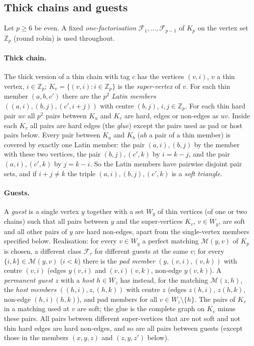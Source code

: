 \subsection{Thick chains and guests}\label{sec:hthick}
Let $p\ge6$ be even. A fixed \emph{one-factorisation} $\mathcal F_1,\dots,\mathcal F_{p-1}$ of $K_p$ on the vertex set $\mathbb Z_p$ (round robin) is used throughout.

\paragraph{Thick chain.} The thick version of a thin chain with tag $c$ has the vertices $(v,i)$, $v$ a thin vertex, $i\in\mathbb Z_p$; $K_v=\{(v,i):i\in\mathbb Z_p\}$ is the \emph{super-vertex} of $v$. For each thin member $(a,b,c')$ there are the $p^2$ \emph{Latin members} $((a,i),(b,j),(c',i+j))$ with centre $(b,j)$, $i,j\in\mathbb Z_p$. For each thin hard pair $uv$ all $p^2$ pairs between $K_u$ and $K_v$ are hard, edges or non-edges as $uv$. Inside each $K_v$ all pairs are hard edges (the \emph{glue}) except the pairs used as pad or host pairs below. Every pair between $K_a$ and $K_b$ ($ab$ a pair of a thin member) is covered by exactly one Latin member: the pair $(a,i),(b,j)$ by the member with these two vertices, the pair $(b,j),(c',k)$ by $i=k-j$, and the pair $(a,i),(c',k)$ by $j=k-i$. So the Latin members have pairwise disjoint pair sets, and if $i+j\ne k$ the triple $(a,i),(b,j),(c',k)$ is a \emph{soft triangle}.

\paragraph{Guests.} A \emph{guest} is a single vertex $y$ together with a set $W_y$ of thin vertices (of one or two chains) such that all pairs between $y$ and the super-vertices $K_v$, $v\in W_y$, are soft and all other pairs of $y$ are hard non-edges, apart from the single-vertex members specified below. Realisation: for every $v\in W_y$ a perfect matching $\mathcal M(y,v)$ of $K_p$ is chosen, a different class $\mathcal F_r$ for different guests at the same $v$; for every $\{i,k\}\in\mathcal M(y,v)$ ($i<k$) there is the \emph{pad member} $(y,(v,i),(v,k))$ with centre $(v,i)$ (edges $y(v,i)$ and $(v,i)(v,k)$, non-edge $y(v,k)$). A \emph{permanent guest} $z$ with a \emph{host} $h\in W_z$ has instead, for the matching $\mathcal M(z,h)$, the \emph{host members} $((h,i),z,(h,k))$ with centre $z$ (edges $z(h,i)$, $z(h,k)$, non-edge $(h,i)(h,k)$), and pad members for all $v\in W_z\setminus\{h\}$. The pairs of $K_v$ in a matching used at $v$ are soft; the glue is the complete graph on $K_v$ minus these pairs. All pairs between different super-vertices that are not soft and not thin hard edges are hard non-edges, and so are all pairs between guests (except those in the members $(x,y,z)$ and $(z,y,z')$ below).

